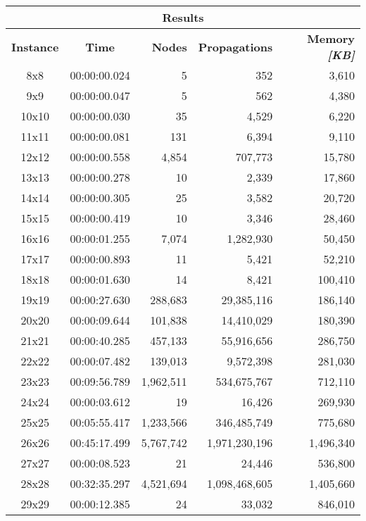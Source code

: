 
\begin{center}
    \begin{tabular}{|c|c|r|r|r|}
        \hline
        \multicolumn{5}{|c|}{\textbf{Results}} \\
        \hline
        \textbf{Instance} & \textbf{Time} & \textbf{Nodes} & \textbf{Propagations} & \textbf{Memory \textit{[KB]}} \\
        
        \hline
		8x8 & 00:00:00.024 & 5 & 352 & 3,610 \\ \hline
		9x9 & 00:00:00.047 & 5 & 562 & 4,380 \\ \hline
		10x10 & 00:00:00.030 & 35 & 4,529 & 6,220 \\ \hline
		11x11 & 00:00:00.081 & 131 & 6,394 & 9,110 \\ \hline
		12x12 & 00:00:00.558 & 4,854 & 707,773 & 15,780 \\ \hline
		13x13 & 00:00:00.278 & 10 & 2,339 & 17,860 \\ \hline
		14x14 & 00:00:00.305 & 25 & 3,582 & 20,720 \\ \hline
		15x15 & 00:00:00.419 & 10 & 3,346 & 28,460 \\ \hline
		16x16 & 00:00:01.255 & 7,074 & 1,282,930 & 50,450 \\ \hline
		17x17 & 00:00:00.893 & 11 & 5,421 & 52,210 \\ \hline
		18x18 & 00:00:01.630 & 14 & 8,421 & 100,410 \\ \hline
		19x19 & 00:00:27.630 & 288,683 & 29,385,116 & 186,140 \\ \hline
		20x20 & 00:00:09.644 & 101,838 & 14,410,029 & 180,390 \\ \hline
		21x21 & 00:00:40.285 & 457,133 & 55,916,656 & 286,750 \\ \hline
		22x22 & 00:00:07.482 & 139,013 & 9,572,398 & 281,030 \\ \hline
		23x23 & 00:09:56.789 & 1,962,511 & 534,675,767 & 712,110 \\ \hline
		24x24 & 00:00:03.612 & 19 & 16,426 & 269,930 \\ \hline
		25x25 & 00:05:55.417 & 1,233,566 & 346,485,749 & 775,680 \\ \hline
		26x26 & 00:45:17.499 & 5,767,742 & 1,971,230,196 & 1,496,340 \\ \hline
		27x27 & 00:00:08.523 & 21 & 24,446 & 536,800 \\ \hline
		28x28 & 00:32:35.297 & 4,521,694 & 1,098,468,605 & 1,405,660 \\ \hline
		29x29 & 00:00:12.385 & 24 & 33,032 & 846,010 \\ \hline

\end{tabular}
\end{center}

